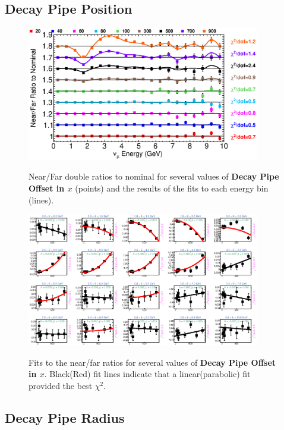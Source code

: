 \clearpage
\subsection{Decay Pipe Position}

\begin{figure}[ht]
  \begin{center}
    {\includegraphics[width=4.0in]{figures/DecayPipeOffsetX_nof_summary.eps}}
  \end{center}
\caption{ Near/Far double ratios to nominal for several values of {\bf Decay Pipe Offset in $x$} (points) and the results of the fits to each energy bin (lines).}
\end{figure}

\begin{figure}[hb]
  \begin{center}
    {\includegraphics[width=4.0in]{figures/DecayPipeOffsetX_nof_fits.eps}}
  \end{center}
\caption{ Fits to the near/far ratios for several values of {\bf Decay Pipe Offset in $x$}. Black(Red) fit lines indicate that a linear(parabolic) fit provided the best $\chi^2$. }
\end{figure}

\clearpage
\subsection{Decay Pipe Radius}

